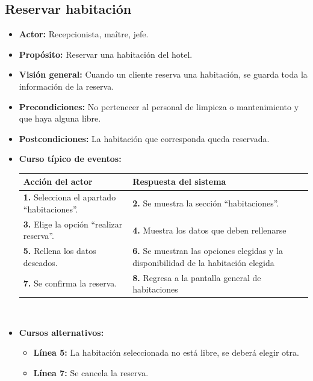 \documentclass[spanish,a4paper,11pt, twoside]{report}	%
\begin{document}
	\subsection{Reservar habitación}
		\begin{itemize}
			\item \textbf{Actor:} Recepcionista, maître, jefe.
			\item \textbf{Propósito: } Reservar una habitación del hotel.
			\item \textbf{Visión general:} Cuando un cliente reserva una habitación, se
				guarda toda la información de la reserva.
			\item \textbf{Precondiciones:} No pertenecer al personal de limpieza o mantenimiento y que haya alguna libre.
			\item \textbf{Postcondiciones:} La habitación que corresponda queda reservada.
			\item \textbf{Curso típico de eventos:} 	\\
				\begin{tabular}{|p{6cm}||p{6cm}|}
				\hline
				\textbf{Acción del actor} & \textbf{Respuesta del sistema} \\ \hline
				\textbf{1.} Selecciona el apartado  ``habitaciones''. & 
				\textbf{2.} Se muestra la sección ``habitaciones''.\\ \hline 
				\textbf{3.} Elige  la opción ``realizar reserva''. & 
				\textbf{4.} Muestra los datos que deben rellenarse  \\ \hline
				\textbf{5.} Rellena los datos deseados. & 
				\textbf{6.} Se muestran las opciones elegidas y la disponibilidad de la habitación elegida \\ \hline
				\textbf{7.} Se confirma la reserva. & 
				\textbf{8.} Regresa a la pantalla general de habitaciones\\ \hline
			\end{tabular}
			\\
			\item \textbf{Cursos alternativos:} 
			\begin{itemize}
			\item  \textbf{Línea 5:} La habitación seleccionada no está libre, se deberá elegir otra.
			\item  \textbf{Línea 7:} Se cancela la reserva. \\
			\end {itemize}
		\end {itemize}

\end{document}

